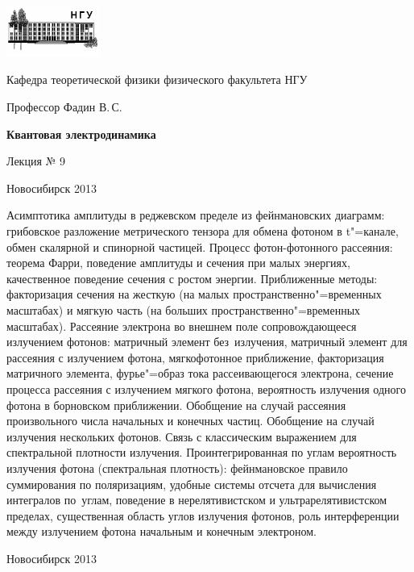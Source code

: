 \documentclass[12pt,pagesize,paper=192mm:108mm]{scrbook}
\begin{document}
\begin{titlepage}
  \vspace*{-1em}
  \begin{center}
    \includegraphics[width=0.23\textwidth]{../NSU-logo}

    Кафедра теоретической физики физического факультета НГУ
    \medskip

    \Large
    Профессор Фадин В.\,С.
    \bigskip

    \huge
    \textbf{Квантовая электродинамика}
    \bigskip

    \Large
    Лекция № 9
    \vfill

    \normalsize
    \vfill

    \normalsize \ccbysa\hspace{0.5em}  Новосибирск 2013
  \end{center}
\end{titlepage}
\vspace*{-1em}
\begin{center}
\vfill
  \begin{minipage}{0.9\linewidth}
    Асимптотика амплитуды в реджевском пределе из фейнмановских
    диаграмм: грибовское разложение метрического тензора для обмена
    фотоном в t"=канале, обмен скалярной и спинорной частицей. Процесс
    фотон-фотонного рассеяния: теорема Фарри, поведение амплитуды и
    сечения при малых энергиях, качественное поведение сечения с
    ростом энергии. Приближенные методы: факторизация сечения на
    жесткую (на малых пространственно"=временных масштабах) и мягкую
    часть (на больших пространственно"=временных масштабах). Рассеяние
    электрона во внешнем поле сопровождающееся излучением фотонов:
    матричный элемент без~излучения, матричный элемент для рассеяния с
    излучением фотона, мягкофотонное приближение, факторизация
    матричного элемента, фурье"=образ тока рассеивающегося электрона,
    сечение процесса рассеяния с излучением мягкого фотона,
    вероятность излучения одного фотона в борновском
    приближении. Обобщение на случай рассеяния произвольного числа
    начальных и конечных частиц. Обобщение на случай излучения
    нескольких фотонов. Связь с классическим выражением для
    спектральной плотности излучения. Проинтегрированная по углам
    вероятность излучения фотона (спектральная плотность):
    фейнмановское правило суммирования по поляризациям, удобные
    системы отсчета для вычисления интегралов по~углам, поведение в
    нерелятивистском и ультрарелятивистском пределах, существенная
    область углов излучения фотонов, роль интерференции между
    излучением фотона начальным и конечным электроном.
  \end{minipage}
  \vfill

  \normalsize \ccbysa\hspace{0.5em} Новосибирск 2013
\end{center}
\end{document}
